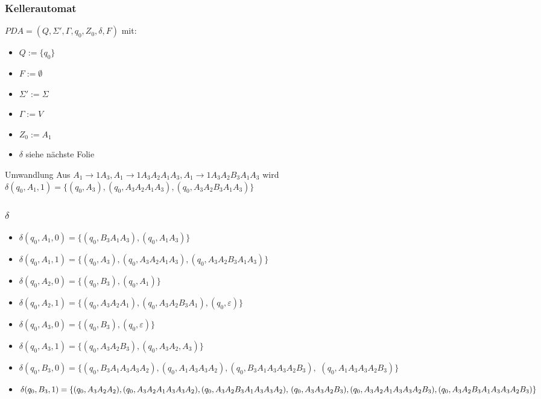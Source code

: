 \documentclass{beamer}
\begin{document}
\begin{frame}
 \frametitle{Kellerautomat}
\(PDA = (Q, \Sigma', \Gamma, q_0, Z_0, \delta, F)\) mit:
 \begin{itemize}
  \item $Q := \{q_0\}$
  \item $F := \emptyset$
  \item $\Sigma' := \Sigma$
  \item $\Gamma := V$
  \item $Z_0 := A_1$
  \item $\delta$ siehe nächste Folie
 \end{itemize}
 \begin{block}{Umwandlung}
 Aus \(A_1 \rightarrow 1A_3, A_1 \rightarrow 1A_3A_2A_1A_3, A_1 \rightarrow 1A_3A_2B_3A_1A_3\)
 wird \(\delta(q_0, A_1, 1) = \{(q_0, A_3), (q_0, A_3A_2A_1A_3), (q_0, A_3A_2B_3A_1A_3) \}\)
 \end{block}
\end{frame}

\begin{frame}
 \frametitle{$\delta$}
\begin{itemize}
 \item \(\delta(q_0, A_1, 0) = \{ (q_0, B_3A_1A_3), (q_0, A_1A_3)\}\)
 \item \(\delta(q_0, A_1, 1) = \{(q_0, A_3), (q_0, A_3A_2A_1A_3), (q_0, A_3A_2B_3A_1A_3) \}\)
 \item \(\delta(q_0, A_2, 0) = \{(q_0, B_3), (q_0, A_1)\}\)
 \item \(\delta(q_0, A_2, 1) = \{(q_0, A_3A_2A_1), (q_0, A_3A_2B_3A_1), (q_0, \varepsilon)\}\)
 \item \(\delta(q_0, A_3, 0) = \{(q_0, B_3), (q_0, \varepsilon)\}\)
 \item \(\delta(q_0, A_3, 1) = \{(q_0, A_3A_2B_3), (q_0, A_3A_2, A_3)\}\)
 \item $\delta(q_0, B_3, 0) = \{(q_0, B_3A_1A_3A_3A_2), (q_0, A_1A_3A_3A_2), (q_0, B_3A_1A_3A_3A_2B_3),$ $ (q_0, A_1A_3A_3A_2B_3)\}$
 \item \(\delta(q_0, B_3, 1) = \{(q_0, A_3A_2A_2), (q_0, A_3A_2A_1A_3A_3A_2), (q_0, A_3A_2B_3A_1A_3A_3A_2),$ $
 (q_0, A_3A_3A_2B_3), (q_0, A_3A_2A_1A_3A_3A_2B_3), (q_0, A_3A_2B_3A_1A_3A_3A_2B_3)\}\)
\end{itemize}
\end{frame}
\end{document}
